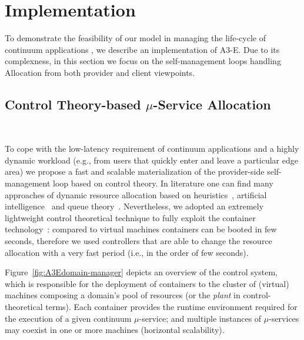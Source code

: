 \section{Implementation}\label{sec:implementation}


To demonstrate the feasibility of our model
in managing the life-cycle of continuum applications
, we describe an implementation of A3-E. Due to its complexness, in this section we focus on the self-management loops handling Allocation from both provider and client viewpoints. %

\subsection{Control Theory-based $\mu$-Service Allocation}~\label{sec:ps_allocation}

To cope with the low-latency requirement of continuum applications and a highly dynamic workload  (e.g., from users that quickly enter and leave a particular edge area) we propose a fast and scalable materialization of the provider-side self-management loop based on control theory. In literature one can find many approaches of dynamic resource allocation based on heuristics~\cite{dustdar0}, artificial intelligence~\cite{ia1} and queue theory~\cite{queue1}. Nevertheless, we adopted an extremely lightweight control theoretical technique to fully exploit the container technology~\cite{Quatrocchi2016discrete}: compared to virtual machines containers can be booted in few seconds, therefore we used controllers that are able to change the resource allocation with a very fast period (i.e., in the order of few seconds).

Figure~\ref{fig:A3Edomain-manager} depicts an overview of the control system, which is responsible for the deployment of containers to the cluster of (virtual) machines composing a domain's pool of resources (or the \textit{plant} in control-theoretical terms). Each container provides the runtime environment required for the execution of a given continuum $\mu$-service; and multiple instances of $\mu$-services may coexist in one or more machines (horizontal scalability).

